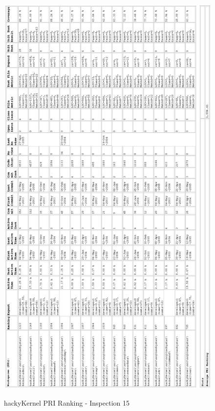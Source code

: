 \begin{figure}[htb]
  \centering
  \caption{hackyKernel PRI Ranking - Inspection 15}
  \includegraphics[totalheight=1.0\textheight]{figs/Results/15_2005-05-25-hackyKernel-printable.eps}
  \label{fig:inspection15-hackyKernel-ranking}
\end{figure}




\clearpage
